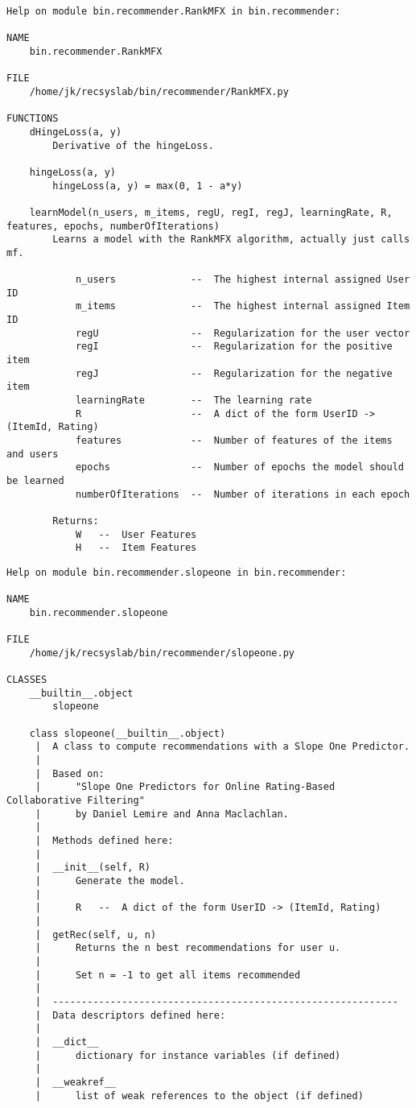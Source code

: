 \begin{lstlisting}
Help on module bin.recommender.RankMFX in bin.recommender:

NAME
    bin.recommender.RankMFX

FILE
    /home/jk/recsyslab/bin/recommender/RankMFX.py

FUNCTIONS
    dHingeLoss(a, y)
        Derivative of the hingeLoss.
    
    hingeLoss(a, y)
        hingeLoss(a, y) = max(0, 1 - a*y)
    
    learnModel(n_users, m_items, regU, regI, regJ, learningRate, R, features, epochs, numberOfIterations)
        Learns a model with the RankMFX algorithm, actually just calls mf.
        
            n_users             --  The highest internal assigned User ID
            m_items             --  The highest internal assigned Item ID
            regU                --  Regularization for the user vector
            regI                --  Regularization for the positive item
            regJ                --  Regularization for the negative item
            learningRate        --  The learning rate
            R                   --  A dict of the form UserID -> (ItemId, Rating)
            features            --  Number of features of the items and users
            epochs              --  Number of epochs the model should be learned
            numberOfIterations  --  Number of iterations in each epoch
        
        Returns:
            W   --  User Features
            H   --  Item Features
\end{lstlisting}

\begin{lstlisting}
Help on module bin.recommender.slopeone in bin.recommender:

NAME
    bin.recommender.slopeone

FILE
    /home/jk/recsyslab/bin/recommender/slopeone.py

CLASSES
    __builtin__.object
        slopeone
    
    class slopeone(__builtin__.object)
     |  A class to compute recommendations with a Slope One Predictor.
     |  
     |  Based on:
     |      "Slope One Predictors for Online Rating-Based Collaborative Filtering"
     |      by Daniel Lemire and Anna Maclachlan.
     |  
     |  Methods defined here:
     |  
     |  __init__(self, R)
     |      Generate the model.
     |      
     |      R   --  A dict of the form UserID -> (ItemId, Rating)
     |  
     |  getRec(self, u, n)
     |      Returns the n best recommendations for user u.
     |      
     |      Set n = -1 to get all items recommended
     |  
     |  ------------------------------------------------------------
     |  Data descriptors defined here:
     |  
     |  __dict__
     |      dictionary for instance variables (if defined)
     |  
     |  __weakref__
     |      list of weak references to the object (if defined)
\end{lstlisting}

